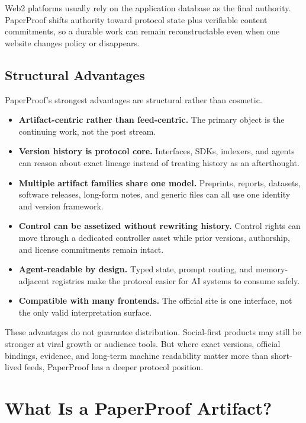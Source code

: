 \documentclass[11pt]{article}
\begin{document}
Web2 platforms usually rely on the application database as the final authority.
PaperProof shifts authority toward protocol state plus verifiable content
commitments, so a durable work can remain reconstructable even when one website
changes policy or disappears.

\subsection{Structural Advantages}

PaperProof's strongest advantages are structural rather than cosmetic.

\begin{itemize}[leftmargin=*]
  \item \textbf{Artifact-centric rather than feed-centric.} The primary object is the continuing work, not the post stream.
  \item \textbf{Version history is protocol core.} Interfaces, SDKs, indexers, and agents can reason about exact lineage instead of treating history as an afterthought.
  \item \textbf{Multiple artifact families share one model.} Preprints, reports, datasets, software releases, long-form notes, and generic files can all use one identity and version framework.
  \item \textbf{Control can be assetized without rewriting history.} Control rights can move through a dedicated controller asset while prior versions, authorship, and license commitments remain intact.
  \item \textbf{Agent-readable by design.} Typed state, prompt routing, and memory-adjacent registries make the protocol easier for AI systems to consume safely.
  \item \textbf{Compatible with many frontends.} The official site is one interface, not the only valid interpretation surface.
\end{itemize}

These advantages do not guarantee distribution. Social-first products may still
be stronger at viral growth or audience tools. But where exact versions,
official bindings, evidence, and long-term machine readability matter more than
short-lived feeds, PaperProof has a deeper protocol position.

\section{What Is a PaperProof Artifact?}
\end{document}

